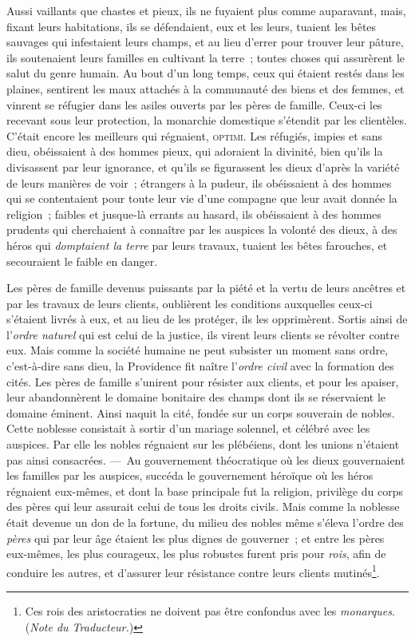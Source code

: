 \documentclass[french,twoside]{book} %
\begin{document}
Aussi vaillants que chastes et pieux, ils ne fuyaient plus comme auparavant, mais, fixant leurs habitations, ils se défendaient, eux et les leurs, tuaient les bêtes sauvages qui infestaient leurs champs, et au lieu d’errer pour trouver leur pâture, ils soutenaient leurs familles en cultivant la terre ; toutes choses qui assurèrent le salut du genre humain. Au bout d’un long temps, ceux qui étaient restés dans  les plaines, sentirent les maux attachés à la communauté des biens et des femmes, et vinrent se réfugier dans les asiles ouverts par les pères de famille. Ceux-ci les recevant sous leur protection, la monarchie domestique s’étendit par les clientèles. C’était encore les meilleurs qui régnaient, {\scshape optimi}. Les réfugiés, impies et sans dieu, obéissaient à des hommes pieux, qui adoraient la divinité, bien qu’ils la divisassent par leur ignorance, et qu’ils se figurassent les dieux d’après la variété de leurs manières de voir ; étrangers à la pudeur, ils obéissaient à des hommes qui se contentaient pour toute leur vie d’une compagne que leur avait donnée la religion ; faibles et jusque-là errants au hasard, ils obéissaient à des hommes prudents qui cherchaient à connaître par les auspices la volonté des dieux, à des héros qui {\itshape domptaient la terre} par leurs travaux, tuaient les bêtes farouches, et secouraient le faible en danger.\par
Les pères de famille devenus puissants par la piété et la vertu de leurs ancêtres et par les travaux de leurs clients, oublièrent les conditions auxquelles ceux-ci s’étaient livrés à eux, et au lieu de les protéger, ils les opprimèrent. Sortis ainsi de l’{\itshape ordre naturel} qui est celui de la justice, ils virent leurs clients se révolter contre eux. Mais comme la société humaine ne peut subsister un moment sans ordre, c’est-à-dire sans dieu, la Providence fit naître l’{\itshape ordre civil} avec la formation des cités. Les pères de famille s’unirent pour résister aux clients, et pour les apaiser, leur abandonnèrent le domaine bonitaire  des champs dont ils se réservaient le domaine éminent. Ainsi naquit la cité, fondée sur un corps souverain de nobles. Cette noblesse consistait à sortir d’un mariage solennel, et célébré avec les auspices. Par elle les nobles régnaient sur les plébéiens, dont les unions n’étaient pas ainsi consacrées. — Au gouvernement théocratique où les dieux gouvernaient les familles par les auspices, succéda le gouvernement héroïque où les héros régnaient eux-mêmes, et dont la base principale fut la religion, privilège du corps des pères qui leur assurait celui de tous les droits civils. Mais comme la noblesse était devenue un don de la fortune, du milieu des nobles même s’éleva l’ordre des {\itshape pères} qui par leur âge étaient les plus dignes de gouverner ; et entre les pères eux-mêmes, les plus courageux, les plus robustes furent pris pour {\itshape rois}, afin de conduire les autres, et d’assurer leur résistance contre leurs clients mutinés\footnote{Ces rois des aristocraties ne doivent pas être confondus avec les {\itshape monarques}. ({\itshape Note du Traducteur.})}.\par
\end{document}
